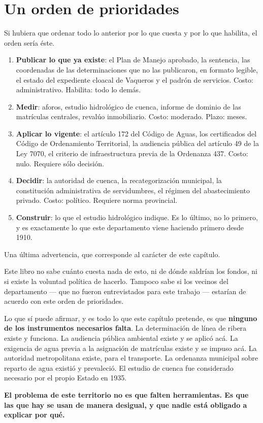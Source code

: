 \section{Un orden de prioridades}

Si hubiera que ordenar todo lo anterior por lo que cuesta y por lo que habilita, el orden
sería éste.

\begin{enumerate}[leftmargin=*]
\item \textbf{Publicar lo que ya existe}: el Plan de Manejo aprobado, la sentencia, las coordenadas de las determinaciones que no las publicaron, en formato legible, el estado del expediente cloacal de Vaqueros y el padrón de servicios. Costo:
administrativo. Habilita: todo lo demás.
\item \textbf{Medir}: aforos, estudio hidrológico de cuenca, informe de dominio de las
matrículas centrales, revalúo inmobiliario. Costo: moderado. Plazo: meses.
\item \textbf{Aplicar lo vigente}: el artículo 172 del Código de Aguas, los certificados del
Código de Ordenamiento Territorial, la audiencia pública del artículo 49 de la Ley 7070, el
criterio de infraestructura previa de la Ordenanza 437. Costo: nulo. Requiere sólo decisión.
\item \textbf{Decidir}: la autoridad de cuenca, la recategorización municipal, la
constitución administrativa de servidumbres, el régimen del abastecimiento privado. Costo:
político. Requiere norma provincial.
\item \textbf{Construir}: lo que el estudio hidrológico indique. Es lo último, no lo primero,
y es exactamente lo que este departamento viene haciendo primero desde 1910.
\end{enumerate}

\begin{cautela}
Una última advertencia, que corresponde al carácter de este capítulo.

Este libro no sabe cuánto cuesta nada de esto, ni de dónde saldrían los fondos, ni si existe
la voluntad política de hacerlo. Tampoco sabe si los vecinos del departamento --- que no
fueron entrevistados para este trabajo --- estarían de acuerdo con este orden de prioridades.

Lo que sí puede afirmar, y es todo lo que este capítulo pretende, es que \textbf{ninguno de
los instrumentos necesarios falta}. La determinación de línea de ribera existe y funciona. La
audiencia pública ambiental existe y se aplicó acá. La exigencia de agua previa a la
asignación de matrículas existe y se impuso acá. La autoridad metropolitana existe, para el
transporte. La ordenanza municipal sobre reparto de agua existió y prevaleció. El estudio de
cuenca fue considerado necesario por el propio Estado en 1935.

\textbf{El problema de este territorio no es que falten herramientas. Es que las que hay se
usan de manera desigual, y que nadie está obligado a explicar por qué.}
\end{cautela}
